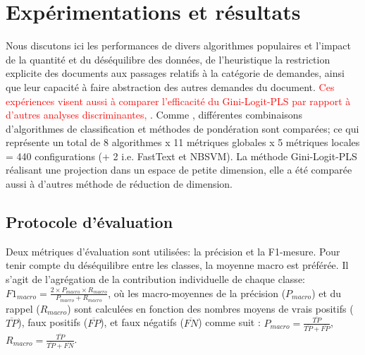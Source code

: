 
\section{Expérimentations et résultats}
\label{sec:sensresultat:experimentations}
Nous discutons ici les performances de divers algorithmes populaires et l'impact de la quantité et du déséquilibre des données, de l'heuristique la restriction explicite des documents aux passages relatifs à la catégorie de demandes, ainsi que leur capacité à faire abstraction des autres demandes du document. \textcolor{red}{Ces expériences visent aussi à comparer l'efficacité du Gini-Logit-PLS par rapport à d'autres analyses discriminantes, }.  Comme \citet{im2017textclasstermweighting}, différentes combinaisons d'algorithmes de classification et méthodes de pondération  sont comparées; ce qui représente un total de 8 algorithmes x 11 métriques globales x 5 métriques locales = 440 configurations (+ 2 i.e. FastText et NBSVM). La méthode Gini-Logit-PLS réalisant une projection dans un espace de petite dimension, elle a été comparée aussi à d'autres méthode de réduction de dimension.

\subsection{Protocole d'évaluation}
Deux métriques d'évaluation sont utilisées: la précision et la F1-mesure. Pour tenir compte du déséquilibre entre les classes, la moyenne macro est préférée. Il s'agit de l'agrégation de la contribution individuelle de chaque classe: $F1_{macro} = \frac{2 \times P_{macro} \times R_{macro}}{P_{macro} + R_{macro}}$, où les macro-moyennes de la précision ($P_{macro}$) et du rappel ($R_{macro}$) sont calculées en fonction des nombres moyens de vrais positifs ($\overline{TP}$), faux positifs ($\overline{FP}$), et faux négatifs ($\overline{FN}$) comme suit \citep{van2013macromicroeval}:
$P_{macro} = \frac{\overline{TP}}{\overline{TP} + \overline{FP}}$, $R_{macro} = \frac{\overline{TP}}{\overline{TP} + \overline{FN}}$.



